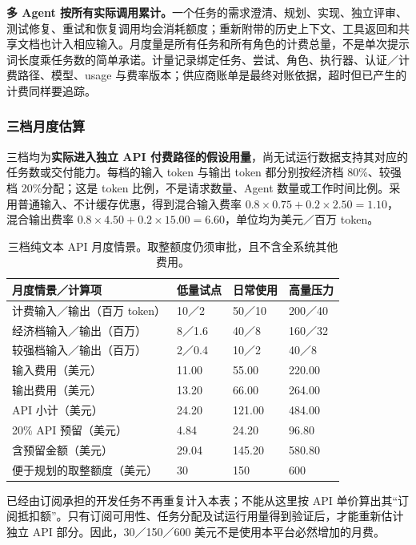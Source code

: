 \documentclass[11pt,a4paper]{article}
\begin{document}
\textbf{多 Agent 按所有实际调用累计。}一个任务的需求澄清、规划、实现、独立评审、测试修复、重试和恢复调用均会消耗额度；重新附带的历史上下文、工具返回和共享文档也计入相应输入。月度量是所有任务和所有角色的计费总量，不是单次提示词长度乘任务数的简单承诺。计量记录绑定任务、尝试、角色、执行器、认证／计费路径、模型、usage 与费率版本；供应商账单是最终对账依据，超时但已产生的计费同样要追踪。

\subsubsection{三档月度估算}

三档均为\textbf{实际进入独立 API 付费路径的假设用量}，尚无试运行数据支持其对应的任务数或交付能力。每档的输入 token 与输出 token 都分别按经济档 80\%、较强档 20\%分配；这是 token 比例，不是请求数量、Agent 数量或工作时间比例。采用普通输入、不计缓存优惠，得到混合输入费率 $0.8\times0.75+0.2\times2.50=1.10$，混合输出费率 $0.8\times4.50+0.2\times15.00=6.60$，单位均为美元／百万 token。

\begin{table}[H]
\centering\small\renewcommand{\arraystretch}{1.22}
\begin{tabularx}{\textwidth}{P{4.1cm} L L L}
\toprule
\textbf{月度情景／计算项} & \textbf{低量试点} & \textbf{日常使用} & \textbf{高量压力}\\
\midrule
计费输入／输出（百万 token） & 10／2 & 50／10 & 200／40\\
经济档输入／输出（百万） & 8／1.6 & 40／8 & 160／32\\
较强档输入／输出（百万） & 2／0.4 & 10／2 & 40／8\\
输入费用（美元） & 11.00 & 55.00 & 220.00\\
输出费用（美元） & 13.20 & 66.00 & 264.00\\
API 小计（美元） & 24.20 & 121.00 & 484.00\\
20\% API 预留（美元） & 4.84 & 24.20 & 96.80\\
含预留金额（美元） & 29.04 & 145.20 & 580.80\\
便于规划的取整额度（美元） & 30 & 150 & 600\\
\bottomrule
\end{tabularx}
\caption{三档纯文本 API 月度情景。取整额度仍须审批，且不含全系统其他费用。}
\end{table}

已经由订阅承担的开发任务不再重复计入本表；不能从这里按 API 单价算出其“订阅抵扣额”。只有订阅可用性、任务分配及试运行用量得到验证后，才能重新估计独立 API 部分。因此，30／150／600 美元不是使用本平台必然增加的月费。
\end{document}

